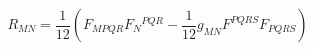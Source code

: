 \begin{equation}
R_{MN}=\frac{1}{12}\left(F_{MPQR}F_{N}{}^{PQR}-\frac{1}{12}g_{MN}
F^{PQRS}F_{PQRS}\right)
\end{equation}

